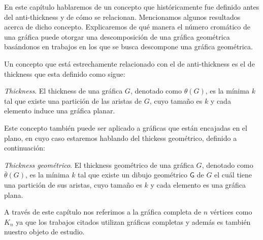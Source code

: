 

En este capítulo hablaremos de un concepto que históricamente fue definido antes
del anti-thickness y de cómo se relacionan. Mencionamos algunos resultados acerca
de dicho concepto. Explicaremos de qué manera el número cromático de una
gráfica puede otorgar una descomposición de una gráfica geométrica basándonos
en trabajos en los que se busca descompone una gráfica geométrica.


Un concepto que está estrechamente relacionado con el de anti-thickness es el
de thickness que esta definido como sigue:
\begin{definition}{\emph{Thickness}.}
  El thickness de una gráfica $G$, denotado como $\theta(G)$, es la mínima $k$ tal que existe
  una partición de las aristas de $G$, cuyo tamaño es $k$ y cada elemento
  induce una gráfica planar.
\end{definition}
Este concepto también puede ser aplicado a gráficas que están encajadas en el plano,
en cuyo caso estaremos hablando del thickess geométrico, definido a continuación:
\begin{definition}{\emph{Thickness geométrico}.}
  El thickness geométrico de una gráfica $G$, denotado como $\bar{\theta}(G)$,
  es la mínima $k$ tal que existe un dibujo geométrico $\mathsf{G}$ de $G$
  el cuál tiene una partición de sus aristas, cuyo tamaño es $k$ y cada
  elemento es una gráfica plana.
\end{definition}

A través de este capítulo nos referimos a la gráfica completa de $n$ vértices
como $K_n$ ya que los trabajos citados utilizan gráficas completas y además
es también nuestro objeto de estudio.

